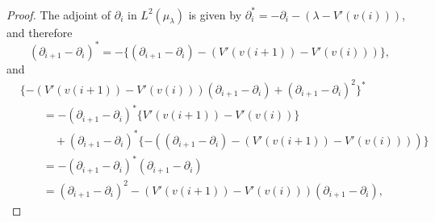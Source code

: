 \documentclass[11pt, a4paper]{article}
\newcommand{\mathd}{\mathrm{d}}
\newcommand{\1}{\mathbf{1}}
\begin{document}
\begin{proof}
  The adjoint of
  $\partial_i$ in $L^2 ({\mu}_{\lambda})$ is given by $\partial_i^{\ast} =
  - \partial_i - (\lambda - V' (v(i)))$, and therefore
  \[ (\partial_{i + 1} - \partial_i)^{\ast} = - \{(\partial_{i + 1} -
     \partial_i) - (V' (v(i + 1)) - V' (v(i)))\}, \]
  and
  \begin{align*}
     &\{ - (V' (v (i + 1)) - V' (v (i))) (\partial_{i + 1} - \partial_i) + (\partial_{i + 1} -
     \partial_i)^2 \}^{\ast} & \\
     &\qquad = - (\partial_{i + 1} - \partial_i)^\ast \{V' (v (i + 1)) - V' (v (i))\} \\
     &\qquad \quad + (\partial_{i + 1} - \partial_i)^\ast \{- ((\partial_{i + 1} -  \partial_i) - (V' (v(i + 1)) - V' (v(i))))\} \\
     &\qquad= - (\partial_{i + 1} - \partial_i)^\ast (\partial_{i + 1} -  \partial_i) \\
     &\qquad = (\partial_{i + 1} -  \partial_i)^2 - (V' (v (i + 1)) - V' (v (i))) (\partial_{i + 1} - \partial_i),
  \end{align*}  
%  
%  
%  
%  

\end{proof}
\end{document}
